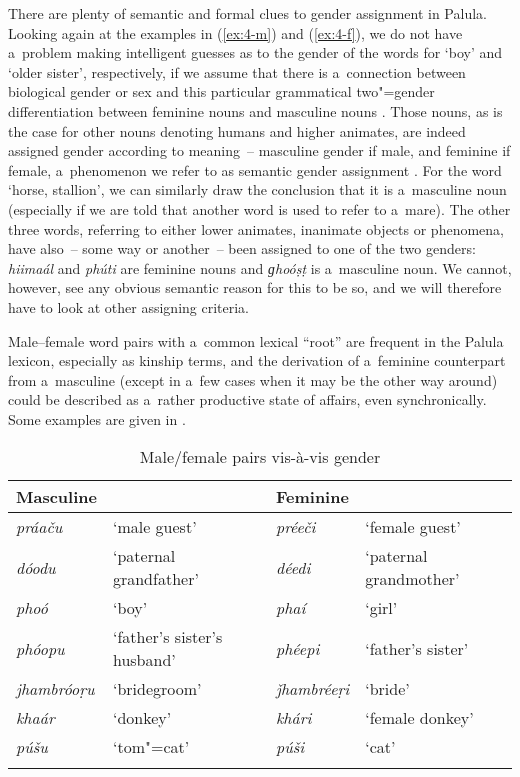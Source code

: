 There are plenty of semantic and formal clues to gender assignment in Palula. Looking again at the examples in (\ref{ex:4-m}) and (\ref{ex:4-f}), we do not have a~problem making intelligent guesses as to the gender of the words for `boy' and `older sister', respectively, if we assume that there is a~connection between biological gender or sex and this particular grammatical two"=gender differentiation between feminine nouns and masculine nouns \citep[102]{dahl2000}. Those nouns, as is the case for other nouns denoting humans and higher animates, are indeed assigned gender according to meaning~-- masculine gender if male, and feminine if female, a~phenomenon we refer to as semantic gender assignment \citep[7--32]{corbett1991}. For the word `horse, stallion', we can similarly draw the conclusion that it is a~masculine noun (especially if we are told that another word is used to refer to a~mare). The other three words, referring to either lower animates, inanimate objects or phenomena, have also~-- some way or another~-- been assigned to one of the two genders: \textit{hiimaál} and \textit{phúti} are feminine nouns and \textit{ɡhoóṣṭ} is a~masculine noun. We cannot, however, see any obvious semantic reason for this to be so, and we will therefore have to look at other assigning criteria.


Male--female word pairs with a~common lexical ``root'' are frequent in the Palula lexicon, especially as kinship terms, and the derivation of a~feminine counterpart from a~masculine (except in a~few cases when it may be the other way around) could be described as a~rather productive state of affairs, even synchronically. Some examples are given in .



\begin{table}[b]
\caption{Male/female pairs vis-à-vis gender}
\begin{tabularx}{\textwidth}{ l Q l Q }
\lsptoprule
Masculine &
&
Feminine &
\\\midrule
\textit{práaču} &
`male guest' &
\textit{préeči} &
`female guest'\\
\textit{dóodu} &
`paternal grandfather' &
\textit{déedi} &
`paternal grandmother'\\
\textit{phoó} &
`boy' &
\textit{phaí} &
`girl'\\
\textit{phóopu} &
`father's sister's husband' &
\textit{phéepi} &
`father's sister'\\
\textit{jhambróoṛu} &
`bridegroom' &
\textit{ǰhambréeṛi} &
`bride'\\
\textit{khaár} &
`donkey' &
\textit{khári} &
`female donkey'\\
\textit{púšu} &
`tom"=cat' &
\textit{púši} &
`cat'\\\lspbottomrule
\end{tabularx}
\label{tab:4-1}
\end{table}


